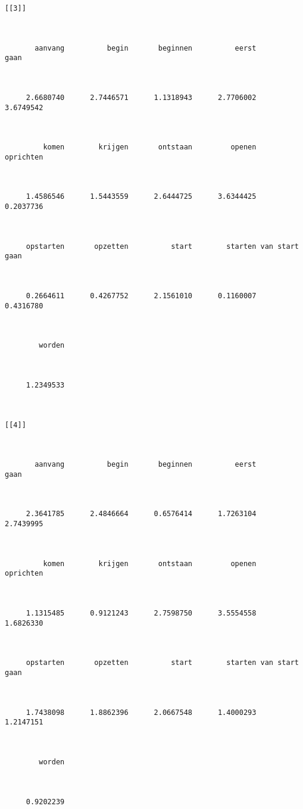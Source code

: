 \begin{lstlisting}
[[3]]



       aanvang          begin       beginnen          eerst           gaan 



     2.6680740      2.7446571      1.1318943      2.7706002      3.6749542 



         komen        krijgen       ontstaan         openen      oprichten 



     1.4586546      1.5443559      2.6444725      3.6344425      0.2037736 



     opstarten       opzetten          start        starten van start gaan 



     0.2664611      0.4267752      2.1561010      0.1160007      0.4316780 



        worden 



     1.2349533 



[[4]]



       aanvang          begin       beginnen          eerst           gaan 



     2.3641785      2.4846664      0.6576414      1.7263104      2.7439995 



         komen        krijgen       ontstaan         openen      oprichten 



     1.1315485      0.9121243      2.7598750      3.5554558      1.6826330 



     opstarten       opzetten          start        starten van start gaan 



     1.7438098      1.8862396      2.0667548      1.4000293      1.2147151 



        worden 



     0.9202239 
\end{lstlisting}
\normalsize
